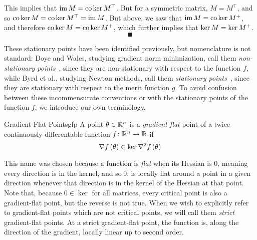 \documentclass[../../thesis.tex]{subfiles}
\begin{document}
\begin{center}
\end{center}

This implies that $\operatorname*{im} M = \operatorname*{co}\ker M^\top$.
But for a symmetric matrix,
$M = M^\top$,
and so $\operatorname*{co}\ker M = \operatorname*{co}\ker M^\top = \operatorname*{im} M$.
But above, we saw that $\operatorname*{im} M = \operatorname*{co}\ker M^{+}$,
and therefore $\operatorname*{co}\ker M = \operatorname*{co}\ker M^{+}$,
which further implies that $\ker M = \ker M^{+}$.
\[\QED\]

These stationary points have been identified previously,
but nomenclature is not standard:
Doye and Wales, studying gradient norm minimization,
call them \emph{non-stationary points}~\cite{doye2002},
since they are non-stationary with respect to the function $f$,
while Byrd et al., studying Newton methods,
call them \emph{stationary points}~\cite{byrd2004},
since they are stationary with respect to the merit function $g$.
To avoid confusion between these incommensurate conventions
or with the stationary points of the function $f$,
we introduce our own terminology.

\begin{definition}{Gradient-Flat Points}{gfp}
	A point $\theta\in\mathbb{R}^n$ is a \emph{gradient-flat} point
	of a twice continuously-differentable function
	$f\colon\mathbb{R}^n\to\mathbb{R}$ if
	\begin{equation}
		\nabla f\left(\theta\right) \in \ker \nabla^2f\left(\theta\right)
	\end{equation}
\end{definition}

This name was chosen because a function is \emph{flat}
when its Hessian is 0, meaning every direction is in the kernel,
and so it is locally flat around a point in a given direction
whenever that direction is in the kernel of the Hessian at that point.
Note that, because $0 \in \ker$ for all matrices,
every critical point is also a gradient-flat point,
but the reverse is not true.
When we wish to explicitly refer to gradient-flat points
which are not critical points,
we will call them \emph{strict} gradient-flat points.
At a strict gradient-flat point, the function is,
along the direction of the gradient,
locally linear up to second order.
\end{document}
